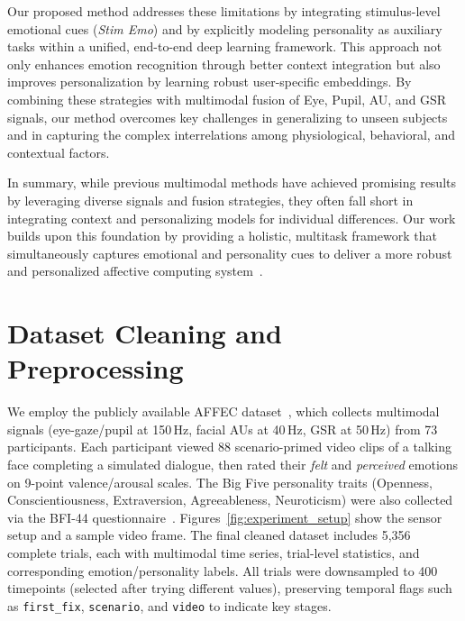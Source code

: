 \documentclass[sigconf]{acmart}
\begin{document}
Our proposed method addresses these limitations by integrating stimulus-level emotional cues (\emph{Stim Emo}) and by explicitly modeling personality as auxiliary tasks within a unified, end-to-end deep learning framework. This approach not only enhances emotion recognition through better context integration but also improves personalization by learning robust user-specific embeddings. By combining these strategies with multimodal fusion of Eye, Pupil, AU, and GSR signals, our method overcomes key challenges in generalizing to unseen subjects and in capturing the complex interrelations among physiological, behavioral, and contextual factors.

In summary, while previous multimodal methods have achieved promising results by leveraging diverse signals and fusion strategies, they often fall short in integrating context and personalizing models for individual differences. Our work builds upon this foundation by providing a holistic, multitask framework that simultaneously captures emotional and personality cues to deliver a more robust and personalized affective computing system~\cite{MultitaskMultifusionERC,MultimodalMultitaskSER}.







\section{Dataset Cleaning and Preprocessing}
\label{sec:cleaning_preprocessing}

We employ the publicly available AFFEC dataset~\cite{j2025affec}, which collects multimodal signals (eye-gaze/pupil at 150\,Hz, facial AUs at 40\,Hz, GSR at 50\,Hz) from 73 participants. Each participant viewed 88 scenario-primed video clips of a talking face completing a simulated dialogue, then rated their \emph{felt} and \emph{perceived} emotions on 9-point valence/arousal scales. The Big Five personality traits (Openness, Conscientiousness, Extraversion, Agreeableness, Neuroticism) were also collected via the BFI-44 questionnaire~\cite{john1991big}.
Figures~\ref{fig:experiment_setup} show the sensor setup and a sample video frame. The final cleaned dataset includes 5,356 complete trials, each with multimodal time series, trial-level statistics, and corresponding emotion/personality labels.
All trials were downsampled to 400 timepoints (selected after trying different values), preserving temporal flags such as \texttt{first\_fix}, \texttt{scenario}, and \texttt{video} to indicate key stages. 
\end{document}
